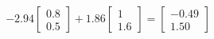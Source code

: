 \documentclass[preview]{standalone}
\begin{document}
\begin{align*}
-2.94 \begin{bmatrix} 0.8 \\ 0.5 \end{bmatrix} + 1.86 \begin{bmatrix} 1 \\ 1.6 \end{bmatrix} = \begin{bmatrix} -0.49 \\ 1.50 \end{bmatrix}
\end{align*}
\end{document}
